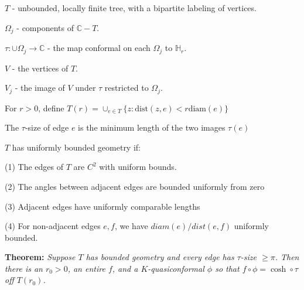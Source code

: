 \documentclass{beamer}
\begin{document}
\begin{frame}

{\tiny $T$ - unbounded, locally finite tree, with a bipartite labeling of vertices.

$\Omega_j$ - components of $\mathbb{C}-T$.

$\tau: \cup \Omega_j \rightarrow \mathbb{C}$ - the map conformal on each $\Omega_j$ to $\mathbb{H}_r$.

$V$ - the vertices of $T$. 

$V_j$ - the image of $V$ under $\tau$ restricted to $\Omega_j$.

For $r > 0$, define $T(r) = \cup_{e\in T} \{z : \textrm{dist}(z,e) < r\textrm{diam}(e) \}$

The $\tau$-size of edge $e$ is the minimum length of the two images $\tau(e)$

\vspace{2.5mm}

$T$ has uniformly bounded geometry if: 

\hspace{5mm} (1) The edges of $T$ are $C^2$ with uniform bounds. 

\hspace{5mm} (2) The angles between adjacent edges are bounded uniformly from zero

\hspace{5mm} (3) Adjacent edges have uniformly comparable lengths

\hspace{5mm} (4) For non-adjacent edges $e, f$, we have $diam(e)/dist(e,f)$ uniformly bounded. 

 }
\vspace{5mm}
{\bf Theorem:} {\it  Suppose $T$ has bounded geometry and every edge has $\tau$-size $\geq \pi$.  Then there is an $r_0 > 0$, an entire $f$, and a $K$-quasiconformal $\phi$ so that $f \circ \phi = \cosh \circ \tau$ off $T(r_0)$. }  

\end{frame}
\end{document}
